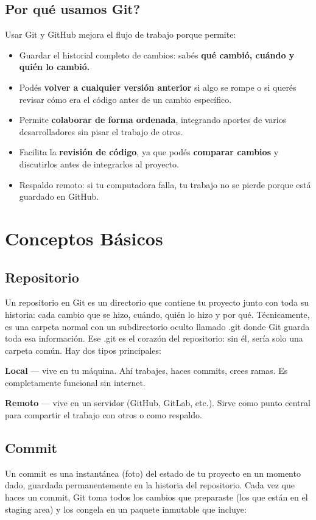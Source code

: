 \documentclass[a4paper,12pt]{report}
\begin{document}
\section{Por qué usamos Git?}
Usar Git y GitHub mejora el flujo de trabajo porque permite:
\begin{itemize}[leftmargin=*]
  \item Guardar el historial completo de cambios: sabés \textbf{qué cambió, cuándo y quién lo cambió.}
  \item Podés \textbf{volver a cualquier versión anterior} si algo se rompe o si querés revisar cómo era
     el código antes de un cambio específico.
  \item Permite \textbf{colaborar de forma ordenada}, integrando aportes de varios desarrolladores sin pisar el trabajo de otros.
  \item Facilita la \textbf{revisión de código}, ya que podés \textbf{comparar cambios} y discutirlos antes de integrarlos al proyecto.
  \item Respaldo remoto: si tu computadora falla, tu trabajo no se pierde porque está guardado en GitHub.
\end{itemize}

\chapter{Conceptos Básicos}
\section{Repositorio}
Un repositorio en Git es un directorio que contiene tu proyecto junto con toda su historia: cada
cambio que se hizo, cuándo, quién lo hizo y por qué.
Técnicamente, es una carpeta normal con un subdirectorio oculto llamado .git donde Git guarda toda
esa información. Ese .git es el corazón del repositorio: sin él, sería solo una carpeta común.
Hay dos tipos principales:

\textbf{Local} — vive en tu máquina. Ahí trabajes, haces commits, crees ramas. Es completamente funcional sin internet.

\textbf{Remoto} — vive en un servidor (GitHub, GitLab, etc.). Sirve como punto central para compartir el trabajo con otros o como respaldo.

\section{Commit}
Un commit es una instantánea (foto) del estado de tu proyecto en un momento dado, guardada permanentemente
en la historia del repositorio.
Cada vez que haces un commit, Git toma todos los cambios que preparaste (los que están en el staging area) y
los congela en un paquete inmutable que incluye:
\end{document}
